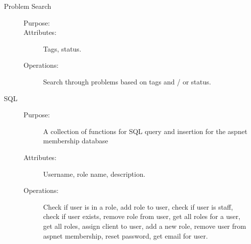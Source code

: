 \begin{description}
\item[Problem Search]\hfill
\begin{description}
\item[Purpose:]
\item[Attributes:]Tags, status.
\item[Operations:]Search through problems based on tags and / or status.
\end{description}
\end{description}

\begin{description}
\item[SQL]\hfill
\begin{description}
\item[Purpose:]A collection of functions for SQL query and insertion for the aspnet membership database
\item[Attributes:]Username, role name, description.
\item[Operations:]Check if user is in a role, add role to user, check if user is staff, check if user exists, remove role from user, get all roles for a user, get all roles, assign client to user, add a new role, remove user from aspnet membership, reset password, get email for user.
\end{description}
\end{description}